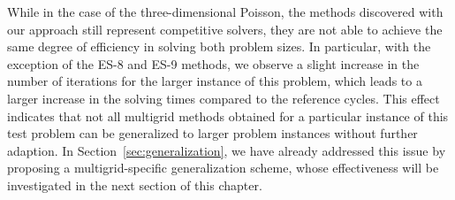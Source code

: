 While in the case of the three-dimensional Poisson, the methods discovered with our approach still represent competitive solvers, they are not able to achieve the same degree of efficiency in solving both problem sizes.
In particular, with the exception of the ES-8 and ES-9 methods, we observe a slight increase in the number of iterations for the larger instance of this problem, which leads to a larger increase in the solving times compared to the reference cycles.
This effect indicates that not all multigrid methods obtained for a particular instance of this test problem can be generalized to larger problem instances without further adaption.
In Section~\ref{sec:generalization}, we have already addressed this issue by proposing a multigrid-specific generalization scheme, whose effectiveness will be investigated in the next section of this chapter.   

